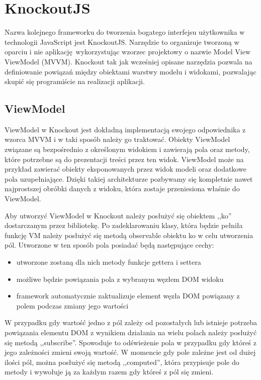 \section{KnockoutJS}
Nazwa kolejnego frameworku do tworzenia bogatego interfejsu użytkownika w technologii JavaScript jest KnockoutJS. Narzędzie to organizuje tworzoną w oparciu i nie aplikację wykorzystując wzorzec projektowy o nazwie Model View ViewModel (MVVM)\cite{knockout-doc}. Knockout tak jak wcześniej opisane narzędzia pozwala na definiowanie powiązań między obiektami warstwy modelu i widokami, pozwalając skupić się programiście na realizacji aplikacji.


\subsection{ViewModel}
ViewModel w Knockout jest dokładną implementacją swojego odpowiednika z wzorca MVVM i w taki sposób należy go traktować. Obiekty ViewModel związane są bezpośrednio z określonym widokiem i zawierają pola oraz metody, które potrzebne są do prezentacji treści przez ten widok. ViewModel może na przykład zawierać obiekty eksponowanych przez widok modeli oraz dodatkowe pola uzupełniające. Dzięki takiej architekturze pozbywamy się kompletnie nawet najprostszej obróbki danych z widoku, która zostaje przeniesiona właśnie do ViewModel.

Aby utworzyć ViewModel w Knockout należy posłużyć się obiektem ,,ko'' dostarczanym przez bibliotekę. Po zadeklarowaniu klasy, która będzie pełniła funkcję VM należy posłużyć się metodą observable obiektu ko w celu utworzenia pól. Utworzone w ten sposób pola posiadać będą następujące cechy:
\begin{itemize}
\item utworzone zostaną dla nich metody funkcje gettera i settera
\item możliwe będzie powiązania pola z wybranym węzłem DOM widoku
\item framework automatycznie zaktualizuje element węzła DOM powiązany z polem podczas zmiany jego wartości
\end{itemize}

W przypadku gdy wartość jedno z pól zależy od pozostałych lub istnieje potrzeba powiązania elementu DOM z wynikiem działania na wielu polach należy posłużyć się metodą ,,subscribe''.
Spowoduje to odświeżenie pola w przypadku gdy któreś z jego zależności zmieni swoją wartość. W momencie gdy pole zależne jest od dużej ilości pól, można posłużyć się metodą ,,computed'', która przypisuje pole do metody i wywołuje ją za każdym razem gdy któreś z pól się zmieni.

